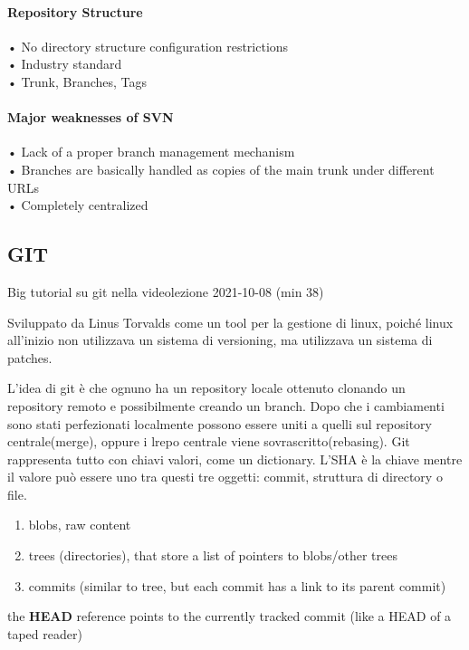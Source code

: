 \documentclass[10pt,a4paper]{book}
\begin{document}
\paragraph{Repository Structure}
• No directory structure configuration restrictions\\
• Industry standard\\
• Trunk, Branches, Tags\\

\paragraph{Major weaknesses of SVN}
• Lack of a proper branch management mechanism\\
• Branches are basically handled as copies of the main trunk under different URLs\\
• Completely centralized\\

\subsection{GIT}
\begin{LARGE}
Big tutorial su git nella videolezione 2021-10-08 (min 38)
\end{LARGE}


Sviluppato da Linus Torvalds come un tool per la gestione di linux, poiché linux all'inizio non utilizzava un sistema di versioning, ma utilizzava un sistema di patches.

L'idea di git è che ognuno ha un repository locale ottenuto clonando un repository remoto e possibilmente creando un branch.
Dopo che i cambiamenti sono stati perfezionati localmente possono essere uniti a quelli sul repository centrale(merge), oppure i lrepo centrale viene sovrascritto(rebasing).
\medskip 
Git rappresenta tutto con chiavi valori, come un dictionary. L'SHA è la chiave mentre il valore può essere uno tra questi tre oggetti: commit, struttura di directory o file.

\begin{enumerate}
\item blobs, raw content
\item trees (directories), that store a list of pointers to blobs/other trees
\item commits (similar to tree, but each commit has a link to its parent commit)
\end{enumerate}


the \textbf{HEAD} reference points to the currently tracked commit (like a HEAD of a taped reader)
\end{document}
